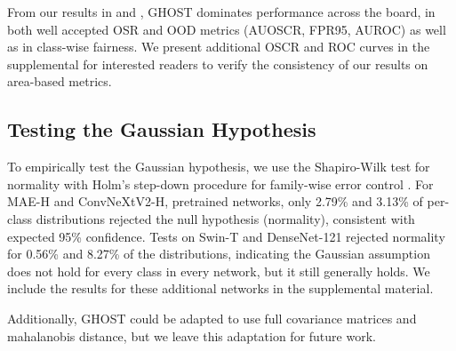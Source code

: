 


From our results in  and , GHOST dominates performance across the board, in both well accepted OSR and OOD metrics (AUOSCR, FPR95, AUROC) as well as in class-wise fairness.
We present additional OSCR and ROC curves in the supplemental for interested readers to verify the consistency of our results on area-based metrics.

\subsection{Testing the Gaussian Hypothesis}
To empirically test the Gaussian hypothesis, we use the Shapiro-Wilk test for normality with Holm's step-down procedure for family-wise error control \cite{trawinski2012nonparametric}. 
For MAE-H and ConvNeXtV2-H, pretrained networks, only 2.79\% and 3.13\% of per-class distributions rejected the null hypothesis (normality), consistent with expected 95\% confidence. 
Tests on Swin-T and DenseNet-121 rejected normality for 0.56\% and 8.27\% of the distributions, indicating the Gaussian assumption does not hold for every class in every network, but it still generally holds. 
We include the results for these additional networks in the supplemental material.

Additionally, GHOST could be adapted to use full covariance matrices and mahalanobis distance, but we leave this adaptation for future work.